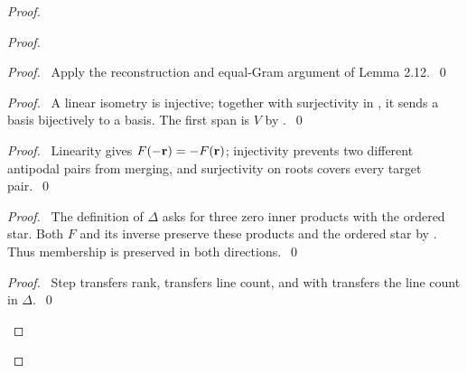 \begin{proof}
 \begin{proof}
  \begin{proof}\pf\ Apply the reconstruction and equal-Gram argument of Lemma 2.12.~\qed\end{proof}
  \begin{proof}
   \pf\ A linear isometry is injective; together with surjectivity in
   , it sends a basis bijectively to a basis.
   The first span is $V$ by .~\qed
  \end{proof}
  \begin{proof}
   \pf\ Linearity gives $F(-{\mathbf r})=-F({\mathbf r})$; injectivity prevents two different
   antipodal pairs from merging, and surjectivity on roots covers every target pair.~\qed
  \end{proof}
  \begin{proof}
   \pf\ The definition of $\Delta$ asks for three zero inner products with the ordered
   star. Both $F$ and its inverse preserve these products and the ordered star by
   . Thus membership is preserved in both directions.~\qed
  \end{proof}
  \qedstep
  \begin{proof}
   \pf\ Step  transfers rank,  transfers line count,
   and  with  transfers the line count in $\Delta$.~\qed
  \end{proof}
 \end{proof}


\end{proof}
